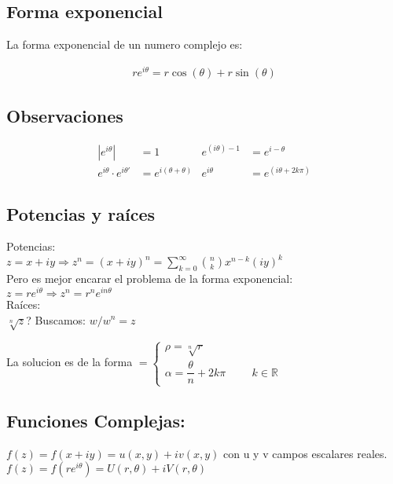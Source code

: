 \documentclass[12pt,a4paper]{article}
\begin{document}
    

\subsection*{Forma exponencial}
La forma exponencial de un numero complejo es:

\begin{align*}
     re^{i\theta}= r\cos(\theta) + r\sin(\theta)
\end{align*}

\subsection*{Observaciones}
\singlespacing
    \begin{align*}
    |e^{i\theta}|&=1  &   e^{(i\theta)-1}&=e^{i-\theta}\\
    e^{i\theta}\cdot e^{i\theta'} &= e^{i(\theta+\theta)}  & e^{i\theta}&= e^{(i\theta+2k\pi)}
    \end{align*}
\subsection*{Potencias y raíces}
\doublespacing
Potencias: \\
$z=x+iy \Rightarrow z^n = (x+iy)^n = \sum_{k=0}^{\infty} \binom{n}{k} x^{n-k}(iy)^k$\\
Pero es mejor encarar el problema de la forma exponencial:\\
$z=re^{i\theta} \Rightarrow z^n = r^n e^{in\theta}$\\
Raíces:\\
$\sqrt[n]{{z}}$? \hspace{1cm}Buscamos:\hspace{1cm} $w/w^n = z$

La solucion es de la forma $=\begin{cases}\rho = \sqrt[n]{r} \\ \alpha = \dfrac{\theta}{n} + 2k\pi \hspace{1cm} k\in \mathbb{R}\end{cases}$

\subsection*{Funciones Complejas:}

$ f(z) = f(x+iy) = u(x,y) + iv(x,y)$ con u y v campos escalares reales.\\
$ f(z) = f(re^{i\theta}) = U(r,\theta) + iV(r,\theta)$
\end{document}
